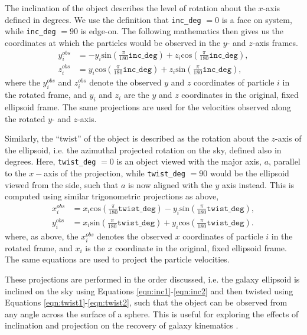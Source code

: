 \documentclass[
  journal=pasa,
  manuscript=research-paper, %
  year=2020,
  volume=37,
]{cup-journal}
\begin{document}
The inclination of the object describes the level of rotation about the $x$-axis defined in degrees. 
We use the definition that \texttt{inc\_deg} $= 0$ is a face on system, while \texttt{inc\_deg} $= 90$ is edge-on. 
The following mathematics then gives us the coordinates at which the particles would be observed in the $y$- and $z$-axis frames. 
\begin{align} \label{eqn:inc1}
    y^{obs}_i &= - y_i \text{sin}\left(\frac{\pi}{180} \texttt{inc\_deg}\right) + z_i  \text{cos}\left(\frac{\pi}{180} \texttt{inc\_deg}\right), \\
    z^{obs}_i &= y_i \text{cos}\left(\frac{\pi}{180} \texttt{inc\_deg}\right) + z_i \text{sin}\left(\frac{\pi}{180} \texttt{inc\_deg}\right), \label{eqn:inc2}
\end{align}
where the $y^{obs}_i$ and $z^{obs}_i$ denote the observed $y$ and $z$ coordinates of particle $i$ in the rotated frame, and $y_i$ and $z_i$ are the $y$ and $z$ coordinates in the original, fixed ellipsoid frame. 
The same projections are used for the velocities observed along the rotated $y$- and $z$-axis.

Similarly, the ``twist'' of the object is described as the rotation about the $z$-axis of the ellipsoid, i.e. the azimuthal projected rotation on the sky, defined also in degrees. 
Here, \texttt{twist\_deg} $= 0$ is an object viewed with the major axis, $a$, parallel to the $x-$axis of the projection, while \texttt{twist\_deg} $= 90$ would be the ellipsoid viewed from the side, such that $a$ is now aligned with the $y$ axis instead. 
This is computed using similar trigonometric projections as above, 
\begin{align} \label{eqn:twist1}
    x^{obs}_i &= x_i \text{cos}\left(\frac{\pi}{180} \texttt{twist\_deg}\right) - y_i \text{sin} \left(\frac{\pi}{180} \texttt{twist\_deg}\right), \\
    y^{obs}_i &= x_i \text{sin} \left(\frac{\pi}{180} \texttt{twist\_deg}\right) + y_i \text{cos} \left(\frac{\pi}{180} \texttt{twist\_deg}\right). \label{eqn:twist2}
\end{align}
where, as above, the $x^{obs}_i$ denotes the observed $x$  coordinates of particle $i$ in the rotated frame, and $x_i$ is the $x$ coordinate in the original, fixed ellipsoid frame. 
The same equations are used to project the particle velocities.

These projections are performed in the order discussed, i.e. the galaxy ellipsoid is inclined on the sky using Equations \ref{eqn:inc1}-\ref{eqn:inc2} and then twisted using Equations \ref{eqn:twist1}-\ref{eqn:twist2}, such that the object can be observed from any angle across the surface of a sphere. 
This is useful for exploring the effects of inclination and projection on the recovery of galaxy kinematics \citep{Harborne2019Alambda_R}.
\end{document}
